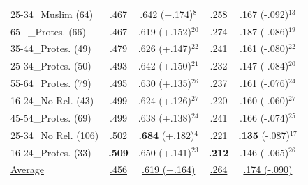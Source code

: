 \begin{tabular}{@{} p{2.65cm} | c c | c c @{}}
25-34\_Muslim (64) & .467 & .642 (+.174)$^{8}$ & .258 & .167 (-.092)$^{13}$ \\
65+\_Protes. (66) & .467 & .619 (+.152)$^{20}$ & .274 & .187 (-.086)$^{19}$ \\
35-44\_Protes. (49) & .479 & .626 (+.147)$^{22}$ & .241 & .161 (-.080)$^{22}$ \\
25-34\_Protes. (50) & .493 & .642 (+.150)$^{21}$ & .232 & .147 (-.084)$^{20}$ \\
55-64\_Protes. (79) & .495 & .630 (+.135)$^{26}$ & .237 & .161 (-.076)$^{24}$ \\
16-24\_No Rel. (43) & .499 & .624 (+.126)$^{27}$ & .220 & .160 (-.060)$^{27}$ \\
45-54\_Protes. (69) & .499 & .638 (+.138)$^{24}$ & .241 & .166 (-.074)$^{25}$ \\
25-34\_No Rel. (106) & .502 & \textbf{.684} (+.182)$^{4}$ & .221 & \textbf{.135} (-.087)$^{17}$ \\
16-24\_Protes. (33) & \textbf{.509} & .650 (+.141)$^{23}$ & \textbf{.212} & .146 (-.065)$^{26}$ \\
\midrule
\underline{Average} & \underline{.456} & \underline{.619 (+.164)} & \underline{.264} & \underline{.174 (-.090)} \\
\bottomrule
\end{tabular}
